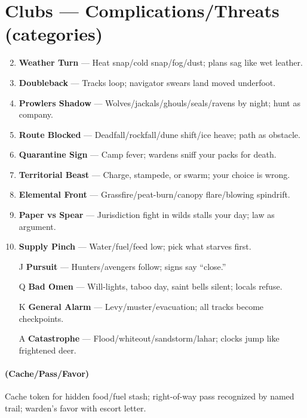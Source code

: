 \section*{Clubs --- Complications/Threats (categories)}
\label{sec:wilderness-complications}
\begin{enumerate}
\setcounter{enumi}{1}
\item \textbf{Weather Turn} --- Heat snap/cold snap/fog/dust; plans sag like wet leather.
\item \textbf{Doubleback} --- Tracks loop; navigator swears land moved underfoot.
\item \textbf{Prowlers Shadow} --- Wolves/jackals/ghouls/seals/ravens by night; hunt as company.
\item \textbf{Route Blocked} --- Deadfall/rockfall/dune shift/ice heave; path as obstacle.
\item \textbf{Quarantine Sign} --- Camp fever; wardens sniff your packs for death.
\item \textbf{Territorial Beast} --- Charge, stampede, or swarm; your choice is wrong.
\item \textbf{Elemental Front} --- Grassfire/peat-burn/canopy flare/blowing spindrift.
\item \textbf{Paper vs Spear} --- Jurisdiction fight in wilds stalls your day; law as argument.
\item \textbf{Supply Pinch} --- Water/fuel/feed low; pick what starves first.
\item[J] \textbf{Pursuit} --- Hunters/avengers follow; signs say ``close.''
\item[Q] \textbf{Bad Omen} --- Will-lights, taboo day, saint bells silent; locals refuse.
\item[K] \textbf{General Alarm} --- Levy/muster/evacuation; all tracks become checkpoints.
\item[A] \textbf{Catastrophe} --- Flood/whiteout/sandstorm/lahar; clocks jump like frightened deer.
\end{enumerate}

\paragraph*{(Cache/Pass/Favor)} Cache token for hidden food/fuel stash; right-of-way pass recognized by named trail; warden's favor with escort letter.

